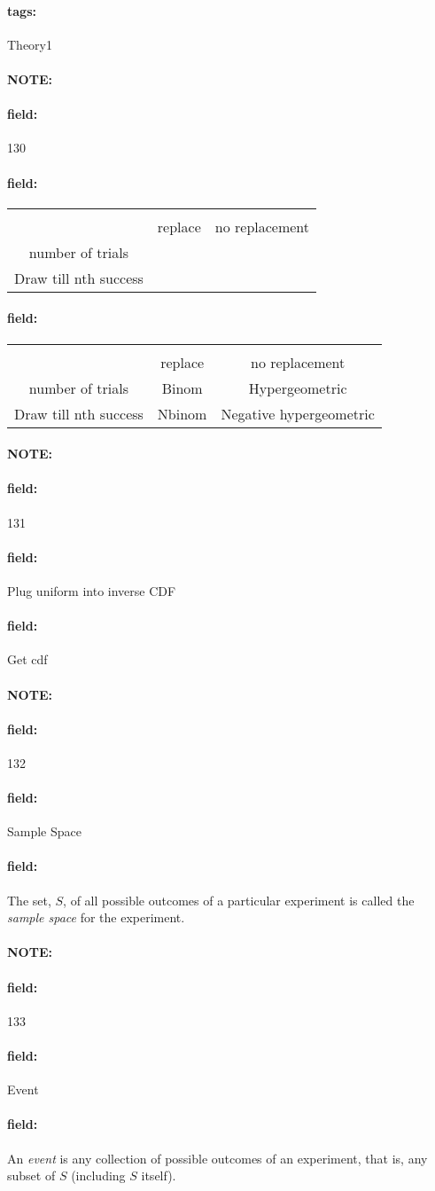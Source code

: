 \documentclass[12pt]{article}
\newenvironment{note}{\paragraph{NOTE:}}{}
\newenvironment{field}{\paragraph{field:}}{}
\newcommand*{\tags}[1]{\paragraph{tags: }#1}
\begin{document}
\tags{Theory1}
\begin{note} \begin{field} \tiny 130 \end{field}
  \begin{field}
    \begin{tabular}{|c| c c |}
    \hline \\
    & replace & no replacement \\
    number of trials &  &  \\
    Draw till nth success & & \\
    \hline
    \end{tabular}
  \end{field}
  \begin{field}
    \begin{tabular}{|c| c c |}
    \hline \\
    & replace & no replacement \\
    number of trials & Binom & Hypergeometric \\
    Draw till nth success & Nbinom & Negative hypergeometric \\
    \hline
    \end{tabular}
  \end{field}
\end{note}

\begin{note} \begin{field} \tiny 131 \end{field}
  \begin{field}
    Plug uniform into inverse CDF
  \end{field}
  \begin{field}
    Get cdf
  \end{field}
\end{note}

\begin{note} \begin{field} \tiny 132 \end{field}
  \begin{field}
    Sample Space
  \end{field}
  \begin{field}
    The set, $S$, of all possible outcomes of a particular experiment is called the \textit{sample space} for the experiment.
  \end{field}
\end{note}

\begin{note} \begin{field} \tiny 133 \end{field}
  \begin{field}
    Event
  \end{field}
  \begin{field}
    An \textit{event} is any collection of possible outcomes of an experiment, that is, any subset of $S$ (including $S$ itself).
  \end{field}
\end{note}
\end{document}
